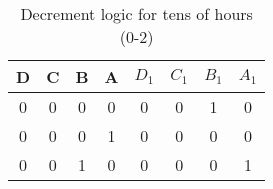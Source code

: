 \begin{table}[ht]
\centering
\caption{Decrement logic for tens of hours (0-2)}
\begin{tabular}{|c|c|c|c|c|c|c|c|}
\hline
D & C & B & A & $D_1$ & $C_1$ & $B_1$ & $A_1$ \\ 
\hline
0 & 0 & 0 & 0 & 0 & 0 & 1 & 0 \\
0 & 0 & 0 & 1 & 0 & 0 & 0 & 0 \\
0 & 0 & 1 & 0 & 0 & 0 & 0 & 1 \\
\hline
\end{tabular}
\end{table}
